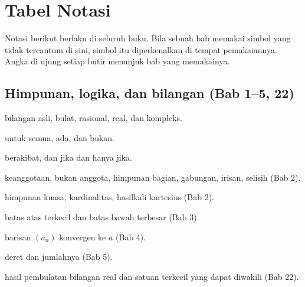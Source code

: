 \documentclass[11pt,a4paper,oneside]{book}
\theoremstyle{definition}
\theoremstyle{plain}
\theoremstyle{remark}
\begin{document}
\chapter{Tabel Notasi}
\label{app:notasi}

Notasi berikut berlaku di seluruh buku. Bila sebuah bab memakai simbol yang tidak
tercantum di sini, simbol itu diperkenalkan di tempat pemakaiannya. Angka di ujung
setiap butir menunjuk bab yang memakainya.

\section*{Himpunan, logika, dan bilangan (Bab 1--5, 22)}
\begin{description}[style=nextline,itemsep=0.25em]
  \item[$\mathbb{N}$, $\mathbb{Z}$, $\mathbb{Q}$, $\mathbb{R}$, $\mathbb{C}$]
        bilangan asli, bulat, rasional, real, dan kompleks.
  \item[$\forall$, $\exists$, $\neg$] untuk semua, ada, dan bukan.
  \item[$\Rightarrow$, $\Leftrightarrow$] berakibat, dan jika dan hanya jika.
  \item[$\in$, $\notin$, $\subseteq$, $\cup$, $\cap$, $\setminus$] keanggotaan,
        bukan anggota, himpunan bagian, gabungan, irisan, selisih (Bab 2).
  \item[$\mathcal{P}(S)$, $|S|$, $S\times T$] himpunan kuasa, kardinalitas,
        hasilkali kartesius (Bab 2).
  \item[$\sup S$, $\inf S$] batas atas terkecil dan batas bawah terbesar (Bab 3).
  \item[$a_n\to a$] barisan $(a_n)$ konvergen ke $a$ (Bab 4).
  \item[$\sum_{n=1}^{\infty} a_n$] deret dan jumlahnya (Bab 5).
  \item[$\mathrm{fl}(x)$, $\mathrm{ulp}$] hasil pembulatan bilangan real dan satuan
        terkecil yang dapat diwakili (Bab 22).
\end{description}
\end{document}
